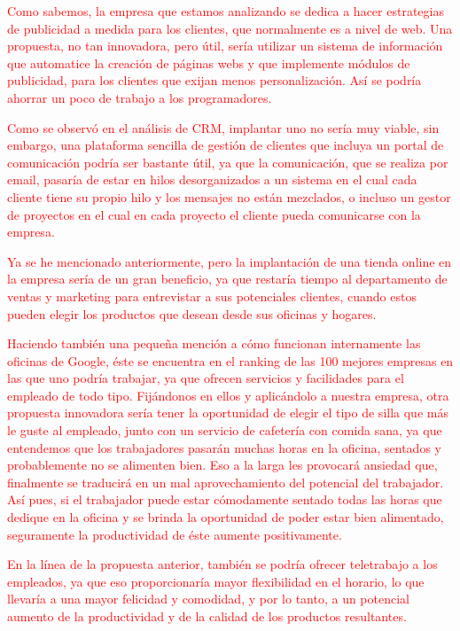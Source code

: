 \documentclass{article}
\begin{document}
\textcolor{Red}{Como sabemos, la empresa que estamos analizando se dedica a hacer estrategias de publicidad a medida para los clientes, que normalmente es a nivel de web. Una propuesta, no tan innovadora, pero útil, sería utilizar un sistema de información que automatice la creación de páginas webs y que implemente módulos de publicidad, para los clientes que exijan menos personalización. Así se podría ahorrar un poco de trabajo a los programadores. }

\textcolor{Red}{Como se observó en el análisis de CRM, implantar uno no sería muy viable, sin embargo, una plataforma sencilla de gestión de clientes que incluya un portal de comunicación podría ser bastante útil, ya que la comunicación, que se realiza por email, pasaría de estar en hilos desorganizados a un sistema en el cual cada cliente tiene su propio hilo y los mensajes no están mezclados, o incluso un gestor de proyectos en el cual en cada proyecto el cliente pueda comunicarse con la empresa.}

\textcolor{Red}{Ya se he mencionado anteriormente, pero la implantación de una tienda online en la empresa sería de un gran beneficio, ya que restaría tiempo al departamento de ventas y marketing para entrevistar a sus potenciales clientes, cuando estos pueden elegir los productos que desean desde sus oficinas y hogares.}

\textcolor{Red}{Haciendo también una pequeña mención a cómo funcionan internamente las oficinas de Google, éste se encuentra en el ranking de las 100 mejores empresas en las que uno podría trabajar, ya que ofrecen servicios y facilidades para el empleado de todo tipo. Fijándonos en ellos y aplicándolo a nuestra empresa, otra propuesta innovadora sería tener la oportunidad de elegir el tipo de silla que más le guste al empleado, junto con un servicio de cafetería con comida sana, ya que entendemos que los trabajadores pasarán muchas horas en la oficina, sentados y probablemente no se alimenten bien. Eso a la larga les provocará ansiedad que, finalmente se traducirá en un mal aprovechamiento del potencial del trabajador. Así pues, si el trabajador puede estar cómodamente sentado todas las horas que dedique en la oficina y se brinda la oportunidad de poder estar bien alimentado, seguramente la productividad de éste aumente positivamente.}

\textcolor{Red}{En la línea de la propuesta anterior, también se podría ofrecer teletrabajo a los empleados, ya que eso proporcionaría mayor flexibilidad en el horario, lo que llevaría a una mayor felicidad y comodidad, y por lo tanto, a un potencial aumento de la productividad y de la calidad de los productos resultantes.}
\end{document}
